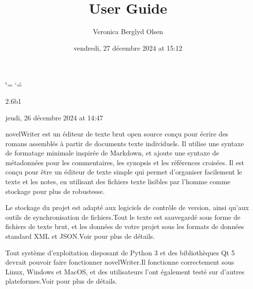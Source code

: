 \documentclass[a4paper,11pt,french]{sphinxmanual}
\title{User Guide}
\date{vendredi, 27 décembre 2024 at 15:12}
\author{Veronica Berglyd Olsen}
\let\sphinxpxdimen\pdfpxdimen\else\newdimen\sphinxpxdimen
\begin{document}
\ifdefined\shorthandoff
  \ifnum\catcode`\=\string=\active\shorthandoff{=}\fi
  \ifnum\catcode`\"=\active{}\fi
\fi

\pagestyle{empty}
\sphinxmaketitle
\pagestyle{plain}
\sphinxtableofcontents
\pagestyle{normal}
\label{\detokenize{index::doc}}


\begin{DUlineblock}{0em}
\item[]  2.6b1
\item[]  jeudi, 26 décembre 2024 at 14:47
\end{DUlineblock}

\sphinxAtStartPar
novelWriter est un éditeur de texte brut open source conçu pour écrire des romans assemblés à partir de documents texte individuels. Il utilise une syntaxe de formatage minimale inspirée de Markdown, et ajoute une syntaxe de métadonnées pour les commentaires, les synopsis et les références croisées. Il est conçu pour être un éditeur de texte simple qui permet d’organiser facilement le texte et les notes, en utilisant des fichiers texte lisibles par l’homme comme stockage pour plus de robustesse.

\begin{figure}[htbp]
\centering

\noindent\sphinxincludegraphics[width=500\sphinxpxdimen]{{screenshot_multi}.png}
\end{figure}

\sphinxAtStartPar
Le stockage du projet est adapté aux logiciels de contrôle de version, ainsi qu’aux outils de synchronisation de fichiers.Tout le texte est sauvegardé sous forme de fichiers de texte brut, et les données de votre projet sous les formats de données standard XML et JSON.Voir {\hyperref[\detokenize{tech_storage:a-storage}]{}} pour plus de détails.

\sphinxAtStartPar
Tout système d’exploitation disposant de Python 3 et des bibliothèques Qt 5 devrait pouvoir faire fonctionner novelWriter.Il fonctionne correctement sous Linux, Windows et MacOS, et des utilisateurs l’ont également testé sur d’autres plateformes.Voir {\hyperref[\detokenize{int_started:a-started}]{}} pour plus de détails.
\end{document}
